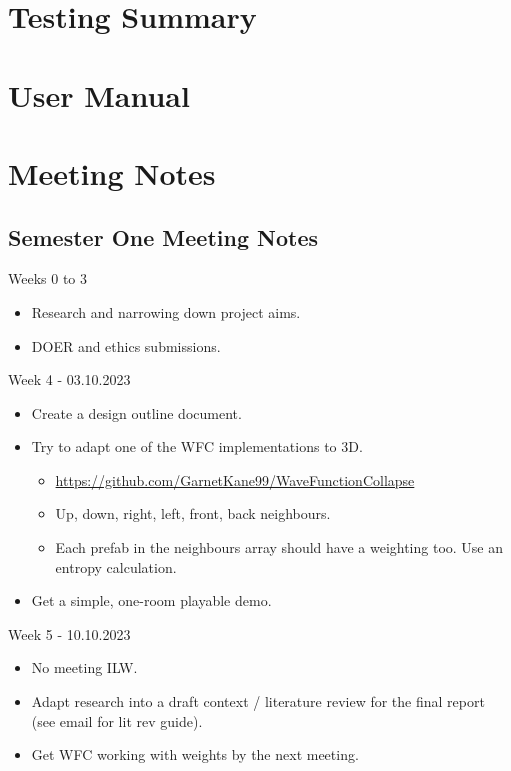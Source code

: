 \appendix
\chapter{Testing Summary}

\chapter{User Manual}


\chapter{Meeting Notes}
\section{Semester One Meeting Notes}
\label{sec:semester_one_meeting_notes}
\noindent Weeks 0 to 3
\begin{itemize}
    \item Research and narrowing down project aims.
    \item DOER and ethics submissions.
\end{itemize}
\noindent Week 4 - 03.10.2023
\begin{itemize}
    \item Create a design outline document.
    \item Try to adapt one of the WFC implementations to 3D.
    \begin{itemize}
        \item \url{https://github.com/GarnetKane99/WaveFunctionCollapse}
        \item Up, down, right, left, front, back neighbours.
        \item Each prefab in the neighbours array should have a weighting too. Use an entropy calculation.
    \end{itemize}
    \item Get a simple, one-room playable demo.
\end{itemize}

\noindent Week 5 - 10.10.2023
\begin{itemize}
    \item No meeting ILW.
    \item Adapt research into a draft context / literature review for the final report (see email for lit rev guide).
    \item Get WFC working with weights by the next meeting.
\end{itemize}

